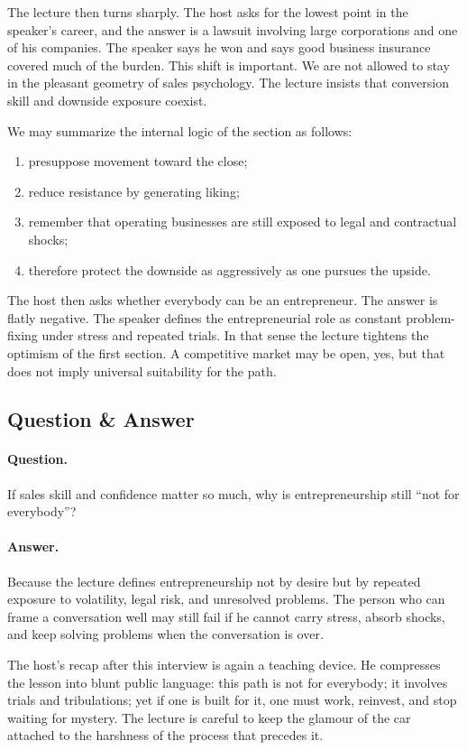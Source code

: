 The lecture then turns sharply. The host asks for the lowest point in the speaker's career, and the answer is a lawsuit involving large corporations and one of his companies. The speaker says he won and says good business insurance covered much of the burden. This shift is important. We are not allowed to stay in the pleasant geometry of sales psychology. The lecture insists that conversion skill and downside exposure coexist.

We may summarize the internal logic of the section as follows:
\begin{enumerate}
\item presuppose movement toward the close;
\item reduce resistance by generating liking;
\item remember that operating businesses are still exposed to legal and contractual shocks;
\item therefore protect the downside as aggressively as one pursues the upside.
\end{enumerate}

The host then asks whether everybody can be an entrepreneur. The answer is flatly negative. The speaker defines the entrepreneurial role as constant problem-fixing under stress and repeated trials. In that sense the lecture tightens the optimism of the first section. A competitive market may be open, yes, but that does not imply universal suitability for the path.

\subsection{Question \& Answer}

\paragraph{Question.} If sales skill and confidence matter so much, why is entrepreneurship still ``not for everybody''?

\paragraph{Answer.} Because the lecture defines entrepreneurship not by desire but by repeated exposure to volatility, legal risk, and unresolved problems. The person who can frame a conversation well may still fail if he cannot carry stress, absorb shocks, and keep solving problems when the conversation is over.

The host's recap after this interview is again a teaching device. He compresses the lesson into blunt public language: this path is not for everybody; it involves trials and tribulations; yet if one is built for it, one must work, reinvest, and stop waiting for mystery. The lecture is careful to keep the glamour of the car attached to the harshness of the process that precedes it.


